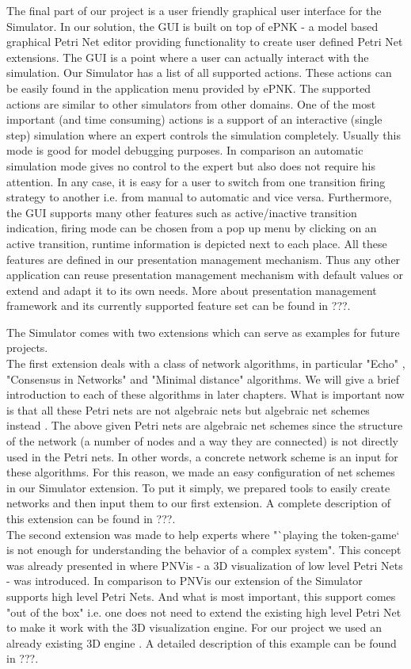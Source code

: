 The final part of our project is a user friendly graphical user interface for the Simulator. In our solution, the GUI is built on top of ePNK \cite{epnk} - a model based graphical Petri Net editor providing functionality to create user defined Petri Net extensions. The GUI is a point where a user can actually interact with the simulation. Our Simulator has a list of all supported actions. These actions can be easily found in the application menu provided by ePNK. The supported actions are similar to other simulators from other domains. One of the most important (and time consuming) actions is a support of an interactive (single step) simulation where an expert controls the simulation completely. Usually this mode is good for model debugging purposes. In comparison an automatic simulation mode gives no control to the expert but also does not require his attention. In any case, it is easy for a user to switch from one transition firing strategy to another i.e. from manual to automatic and vice versa. Furthermore, the GUI supports many other features such as active/inactive transition indication, firing mode can be chosen from a pop up menu by clicking on an active transition, runtime information is depicted next to each place. All these features are defined in our presentation management mechanism. Thus any other application can reuse presentation management mechanism with default values or extend and adapt it to its own needs. More about presentation management framework and its currently supported feature set can be found in ???. 

The Simulator comes with two extensions which can serve as examples for future projects. 
\\The first extension deals with a class of network algorithms, in particular "Echo" \cite{echo}, "Consensus in Networks" \cite{reisig} and "Minimal distance" \cite{min-dist} algorithms. We will give a brief introduction to each of these algorithms in later chapters. What is important now is that all these Petri nets are not algebraic nets but algebraic net schemes instead \cite{net-scheme}. The above given Petri nets are algebraic net schemes since the structure of the network (a number of nodes and a way they are connected) is not directly used in the Petri nets. In other words, a concrete network scheme is an input for these algorithms. For this reason, we made an easy configuration of net schemes in our Simulator extension. To put it simply, we prepared tools to easily create networks and then input them to our first extension. A complete description of this extension can be found in ???.
\\The second extension was made to help experts where "`playing the token-game` is not enough for understanding the behavior of a complex system". This concept was already presented in \cite{pnvis} where PNVis - a 3D visualization of low level Petri Nets - was introduced. In comparison to PNVis our extension of the Simulator supports high level Petri Nets. And what is most important, this support comes "out of the box" i.e. one does not need to extend the existing high level Petri Net to make it work with the 3D visualization engine. For our project we used an already existing 3D engine \cite{3d-engine}. A detailed description of this example can be found in ???. 

